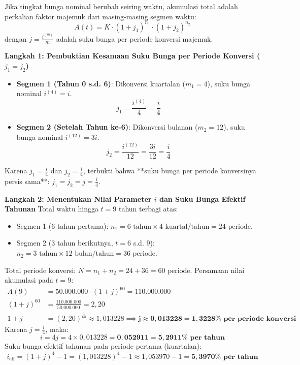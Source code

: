 \documentclass[11pt,a4paper]{article}
\begin{document}
\begin{solusibox}[4]
\begin{konsepbox}
Jika tingkat bunga nominal berubah seiring waktu, akumulasi total adalah perkalian faktor majemuk dari masing-masing segmen waktu:
$$A(t) = K \cdot (1 + j_1)^{n_1} \cdot (1 + j_2)^{n_2}$$
dengan $j = \frac{i^{(m)}}{m}$ adalah suku bunga per periode konversi majemuk.
\end{konsepbox}

\textbf{Langkah 1: Pembuktian Kesamaan Suku Bunga per Periode Konversi ($j_1 = j_2$)}  
\begin{itemize}[leftmargin=4mm, topsep=1pt, itemsep=1pt]
    \item \textbf{Segmen 1 (Tahun 0 s.d. 6)}: Dikonversi kuartalan ($m_1 = 4$), suku bunga nominal $i^{(4)} = i$.
    $$j_1 = \frac{i^{(4)}}{4} = \frac{i}{4}$$
    \item \textbf{Segmen 2 (Setelah Tahun ke-6)}: Dikonversi bulanan ($m_2 = 12$), suku bunga nominal $i^{(12)} = 3i$.
    $$j_2 = \frac{i^{(12)}}{12} = \frac{3i}{12} = \frac{i}{4}$$
\end{itemize}
Karena $j_1 = \frac{i}{4}$ dan $j_2 = \frac{i}{4}$, terbukti bahwa **suku bunga per periode konversinya persis sama**: $j_1 = j_2 = j = \frac{i}{4}$.

\textbf{Langkah 2: Menentukan Nilai Parameter $i$ dan Suku Bunga Efektif Tahunan}  
Total waktu hingga $t=9$ tahun terbagi atas:
\begin{itemize}[leftmargin=4mm, topsep=1pt, itemsep=1pt]
    \item Segmen 1 (6 tahun pertama): $n_1 = 6 \text{ tahun} \times 4 \text{ kuartal/tahun} = 24 \text{ periode}$.
    \item Segmen 2 (3 tahun berikutnya, $t=6$ s.d. $9$): $n_2 = 3 \text{ tahun} \times 12 \text{ bulan/tahun} = 36 \text{ periode}$.
\end{itemize}
Total periode konversi: $N = n_1 + n_2 = 24 + 36 = 60 \text{ periode}$.  
Persamaan nilai akumulasi pada $t=9$:
\begin{align*}
    A(9) &= 50.000.000 \cdot (1 + j)^{60} = 110.000.000 \\
    (1 + j)^{60} &= \frac{110.000.000}{50.000.000} = 2{,}20 \\
    1 + j &= (2{,}20)^{\frac{1}{60}} \approx 1{,}013228 \implies \mathbf{j \approx 0{,}013228 = 1{,}3228\% \text{ per periode konversi}}
\end{align*}
Karena $j = \frac{i}{4}$, maka:
$$i = 4j = 4 \times 0{,}013228 = \mathbf{0{,}052911 = 5{,}2911\% \text{ per tahun}}$$
Suku bunga efektif tahunan pada periode pertama (kuartalan):
$$i_{\text{eff}} = (1 + j)^4 - 1 = (1{,}013228)^4 - 1 \approx 1{,}053970 - 1 = \mathbf{5{,}3970\% \text{ per tahun}}$$


\end{solusibox}
\end{document}
